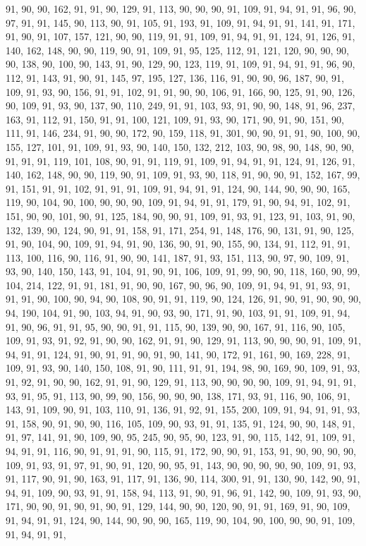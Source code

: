 \begin{sloppypar}
91, 90, 90, 162, 91, 91, 90, 129, 91, 113, 90, 90, 90, 91, 109, 91, 94, 91, 91, 96, 90, 97, 91, 91, 145, 90, 113, 90, 91, 105, 91, 193, 91, 109, 91, 94, 91, 91, 141, 91, 171, 91, 90, 91, 107, 157, 121, 90, 90, 119, 91, 91, 109, 91, 94, 91, 91, 124, 91, 126, 91, 140, 162, 148, 90, 90, 119, 90, 91, 109, 91, 95, 125, 112, 91, 121, 120, 90, 90, 90, 90, 138, 90, 100, 90, 143, 91, 90, 129, 90, 123, 119, 91, 109, 91, 94, 91, 91, 96, 90, 112, 91, 143, 91, 90, 91, 145, 97, 195, 127, 136, 116, 91, 90, 90, 96, 187, 90, 91, 109, 91, 93, 90, 156, 91, 91, 102, 91, 91, 90, 90, 106, 91, 166, 90, 125, 91, 90, 126, 90, 109, 91, 93, 90, 137, 90, 110, 249, 91, 91, 103, 93, 91, 90, 90, 148, 91, 96, 237, 163, 91, 112, 91, 150, 91, 91, 100, 121, 109, 91, 93, 90, 171, 90, 91, 90, 151, 90, 111, 91, 146, 234, 91, 90, 90, 172, 90, 159, 118, 91, 301, 90, 90, 91, 91, 90, 100, 90, 155, 127, 101, 91, 109, 91, 93, 90, 140, 150, 132, 212, 103, 90, 98, 90, 148, 90, 90, 91, 91, 91, 119, 101, 108, 90, 91, 91, 119, 91, 109, 91, 94, 91, 91, 124, 91, 126, 91, 140, 162, 148, 90, 90, 119, 90, 91, 109, 91, 93, 90, 118, 91, 90, 90, 91, 152, 167, 99, 91, 151, 91, 91, 102, 91, 91, 91, 109, 91, 94, 91, 91, 124, 90, 144, 90, 90, 90, 165, 119, 90, 104, 90, 100, 90, 90, 90, 109, 91, 94, 91, 91, 179, 91, 90, 94, 91, 102, 91, 151, 90, 90, 101, 90, 91, 125, 184, 90, 90, 91, 109, 91, 93, 91, 123, 91, 103, 91, 90, 132, 139, 90, 124, 90, 91, 91, 158, 91, 171, 254, 91, 148, 176, 90, 131, 91, 90, 125, 91, 90, 104, 90, 109, 91, 94, 91, 90, 136, 90, 91, 90, 155, 90, 134, 91, 112, 91, 91, 113, 100, 116, 90, 116, 91, 90, 90, 141, 187, 91, 93, 151, 113, 90, 97, 90, 109, 91, 93, 90, 140, 150, 143, 91, 104, 91, 90, 91, 106, 109, 91, 99, 90, 90, 118, 160, 90, 99, 104, 214, 122, 91, 91, 181, 91, 90, 90, 167, 90, 96, 90, 109, 91, 94, 91, 91, 93, 91, 91, 91, 90, 100, 90, 94, 90, 108, 90, 91, 91, 119, 90, 124, 126, 91, 90, 91, 90, 90, 90, 94, 190, 104, 91, 90, 103, 94, 91, 90, 93, 90, 171, 91, 90, 103, 91, 91, 109, 91, 94, 91, 90, 96, 91, 91, 95, 90, 90, 91, 91, 115, 90, 139, 90, 90, 167, 91, 116, 90, 105, 109, 91, 93, 91, 92, 91, 90, 90, 162, 91, 91, 90, 129, 91, 113, 90, 90, 90, 91, 109, 91, 94, 91, 91, 124, 91, 90, 91, 91, 90, 91, 90, 141, 90, 172, 91, 161, 90, 169, 228, 91, 109, 91, 93, 90, 140, 150, 108, 91, 90, 111, 91, 91, 194, 98, 90, 169, 90, 109, 91, 93, 91, 92, 91, 90, 90, 162, 91, 91, 90, 129, 91, 113, 90, 90, 90, 90, 109, 91, 94, 91, 91, 93, 91, 95, 91, 113, 90, 99, 90, 156, 90, 90, 90, 138, 171, 93, 91, 116, 90, 106, 91, 143, 91, 109, 90, 91, 103, 110, 91, 136, 91, 92, 91, 155, 200, 109, 91, 94, 91, 91, 93, 91, 158, 90, 91, 90, 90, 116, 105, 109, 90, 93, 91, 91, 135, 91, 124, 90, 90, 148, 91, 91, 97, 141, 91, 90, 109, 90, 95, 245, 90, 95, 90, 123, 91, 90, 115, 142, 91, 109, 91, 94, 91, 91, 116, 90, 91, 91, 91, 90, 115, 91, 172, 90, 90, 91, 153, 91, 90, 90, 90, 90, 109, 91, 93, 91, 97, 91, 90, 91, 120, 90, 95, 91, 143, 90, 90, 90, 90, 90, 109, 91, 93, 91, 117, 90, 91, 90, 163, 91, 117, 91, 136, 90, 114, 300, 91, 91, 130, 90, 142, 90, 91, 94, 91, 109, 90, 93, 91, 91, 158, 94, 113, 91, 90, 91, 96, 91, 142, 90, 109, 91, 93, 90, 171, 90, 90, 91, 90, 91, 90, 91, 129, 144, 90, 90, 120, 90, 91, 91, 169, 91, 90, 109, 91, 94, 91, 91, 124, 90, 144, 90, 90, 90, 165, 119, 90, 104, 90, 100, 90, 90, 91, 109, 91, 94, 91, 91, 
\end{sloppypar}
